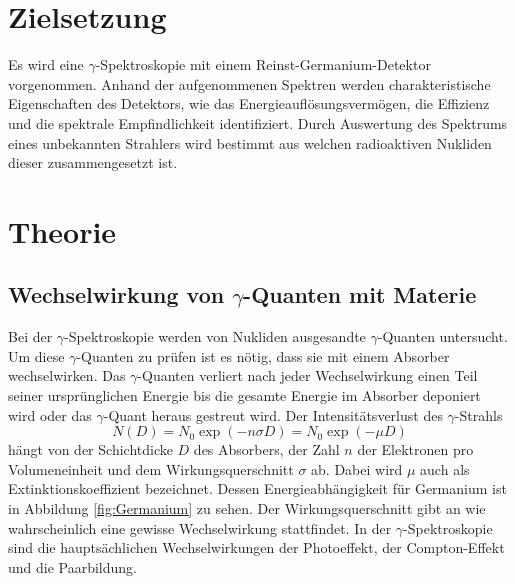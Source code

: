\section{Zielsetzung}
\label{sec:Zielsetzung}
Es wird eine $\gamma$-Spektroskopie mit einem Reinst-Germanium-Detektor vorgenommen.
Anhand der aufgenommenen Spektren werden charakteristische Eigenschaften des Detektors, wie das Energieauflösungsvermögen, die Effizienz und die spektrale Empfindlichkeit identifiziert.
Durch Auswertung des Spektrums eines unbekannten Strahlers wird bestimmt aus welchen radioaktiven Nukliden dieser zusammengesetzt ist.

\section{Theorie}
\label{sec:Theorie}

\subsection{Wechselwirkung von \texorpdfstring{$\gamma$}{gamma}-Quanten mit Materie}
Bei der $\gamma$-Spektroskopie werden von Nukliden ausgesandte $\gamma$-Quanten untersucht.
Um diese $\gamma$-Quanten zu prüfen ist es nötig, dass sie mit einem Absorber wechselwirken.
Das $\gamma$-Quanten verliert nach jeder Wechselwirkung einen Teil seiner ursprünglichen Energie bis die gesamte Energie im Absorber deponiert wird oder das $\gamma$-Quant heraus gestreut wird.
Der Intensitätsverlust des $\gamma$-Strahls
\begin{equation}
  \label{eq:Absorbtion}
  N(D)=N_0\exp(-n\sigma D)=N_0\exp(-\mu D)
\end{equation}
hängt von der Schichtdicke $D$ des Absorbers, der Zahl $n$ der Elektronen pro Volumeneinheit und dem Wirkungsquerschnitt $\sigma$ ab. 
Dabei wird $\mu$ auch als Extinktionskoeffizient bezeichnet. Dessen Energieabhängigkeit für Germanium ist in Abbildung \ref{fig:Germanium} zu sehen.
Der Wirkungsquerschnitt gibt an wie wahrscheinlich eine gewisse Wechselwirkung stattfindet.
In der $\gamma$-Spektroskopie sind die hauptsächlichen Wechselwirkungen der Photoeffekt, der Compton-Effekt und die Paarbildung.


